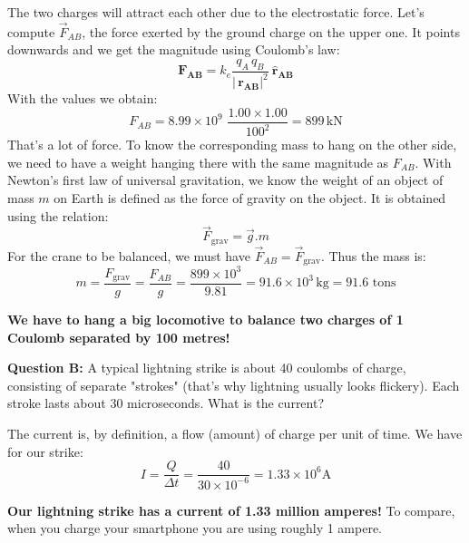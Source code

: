 \documentclass[12pt]{article}
\begin{document}
{\color{blue}
The two charges will attract each other due to the electrostatic force. Let's compute $\vec{F}_{AB}$, the force exerted by the ground charge on the upper one.
It points downwards and we get the magnitude using Coulomb's law:
\begin{equation}
 \mathbf{F_{AB}} = k_e \frac{q_A \, q_B}{| \, \mathbf{r_{AB}}|^2} \: \mathbf{\hat{r}_{AB}}
\end{equation}
With the values we obtain:
\begin{equation}
 F_{AB} = 8.99 \times 10^9 \, \, \frac{1.00 \times 1.00}{  100 ^2}  = 899 \, \text{kN}
\end{equation}
That's a lot of force. To know the corresponding mass to hang on the other side, we need to have a weight hanging there with the same magnitude as $F_{AB}$. 
With Newton's first law of universal gravitation, we know the weight of an object of mass $m$ on Earth is defined as the force of gravity on the object. It is obtained using the relation:
\begin{equation}
 \vec{F}_\text{grav} = \vec{g} . m
\end{equation}
For the crane to be balanced, we must have $\vec{F}_{AB} = \vec{F}_\text{grav}$. Thus the mass is:
\begin{equation}
 m = \frac{F_\text{grav}}{g} = \frac{F_{AB}}{g} = \frac{899 \times 10^3}{9.81} = 91.6 \times 10^3 \, \text{kg} =  91.6 \, \, \text{tons}
\end{equation}

\textbf{We have to hang a big locomotive to balance two charges of 1 Coulomb separated by 100 metres!}
}
\newline

\textbf{Question B:} A typical lightning strike is about 40 coulombs of charge, consisting of separate "strokes" (that's why lightning usually looks flickery). Each stroke lasts about 30 microseconds. What is the current?\\

{\color{blue}
The current is, by definition, a flow (amount) of charge per unit of time. We have for our strike:
\begin{equation}
 I = \frac{Q}{\Delta t} = \frac{40 }{30 \times 10^{-6} } = 1.33 \times 10^6 \text{A}
\end{equation}

\textbf{Our lightning strike has a current of 1.33 million amperes!}
\newline
To compare, when you charge your smartphone you are using roughly 1 ampere.

}
\end{document}
